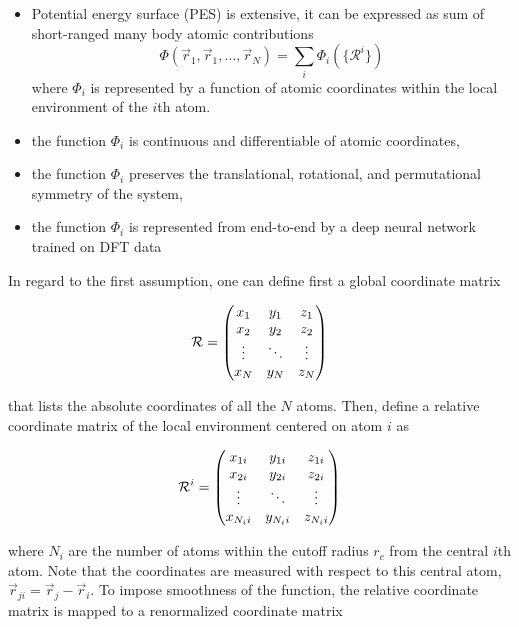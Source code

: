 \begin{itemize}

    \item  Potential energy surface (PES) is extensive, it can be expressed as
          sum		of	     short-ranged many body atomic
          contributions
          \begin{equation}
              \Phi(\vec{r}_1,\vec{r}_1,\hdots, \vec{r}_N) = \sum_i
              \Phi_i(\{\mathcal{R}^i\})
          \end{equation}
          where $\Phi_i$ is represented by	     a		 function
          of atomic coordinates within the local environment of      the
          $i$th atom.
    \item  the function $\Phi_i$ is continuous and differentiable
          of atomic coordinates,
    \item the function $\Phi_i$ preserves the translational, rotational,
          and
          permutational symmetry of the system,
    \item the function $\Phi_i$ is represented from end-to-end by a deep
          neural network trained on DFT data
\end{itemize}

In regard to the first assumption, one can define first a global coordinate
matrix

\begin{equation}
    \mathcal{R} =  \mqty( x_1 & y_1 & z_1 \\ x_2 & y_2 & z_2 \\ \vdots & \ddots
    &
    \vdots \\
    x_N & y_N & z_N)
\end{equation}

that lists the absolute coordinates of all the $N$ atoms. Then, define a
relative
coordinate matrix of the local environment centered on atom  $i$ as

\begin{equation}
    \mathcal{R}^i =  \mqty( x_{1i} & y_{1i} & z_{1i} \\ x_{2i} & y_{2i} &
    z_{2i}
    \\ \vdots & \ddots
    &
    \vdots \\
    x_{N_i i} & y_{N_i i} & z_{N_i i})
\end{equation}

where $N_i$ are the number of atoms within the cutoff radius $r_c$ from the
central $i$th atom. Note that the coordinates are measured with respect to this
central atom, $\vec{r}_{ji} = \vec{r}_{j}- \vec{r}_{i}$. To impose smoothness
of the function, the relative coordinate matrix is mapped to  a renormalized
coordinate matrix

